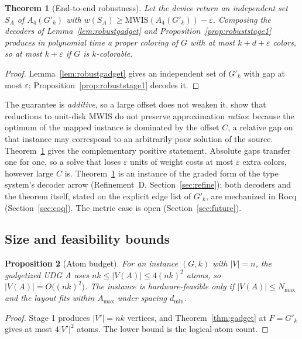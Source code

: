 \documentclass[a4paper,fleqn]{cas-sc}
\newtheorem{theorem}{Theorem}[section]
\newtheorem{proposition}[theorem]{Proposition}
\newcommand{\MWIS}{\mathrm{MWIS}}
\begin{document}
\begin{theorem}[End-to-end robustness]
\label{thm:robust}
Let the device return an independent set $S_A$ of $A_4(G'_k)$ with
$w(S_A)\ge\MWIS(A_4(G'_k))-\varepsilon$. Composing the decoders of
Lemma~\ref{lem:robustgadget} and Proposition~\ref{prop:robuststage1} produces in
polynomial time a proper coloring of $G$ with at most $k+d+\varepsilon$ colors,
so at most $k+\varepsilon$ if $G$ is $k$-colorable.
\end{theorem}

\begin{proof}
Lemma~\ref{lem:robustgadget} gives an independent set of $G'_k$ with gap at most
$\varepsilon$; Proposition~\ref{prop:robuststage1} decodes it.
\end{proof}

The guarantee is \emph{additive}, so a large offset does not weaken it.
\citet{Cazals2025} show that reductions to unit-disk MWIS do not preserve
approximation \emph{ratios}: because the optimum of the mapped instance is dominated
by the offset $C$, a relative gap on that instance may correspond to an arbitrarily
poor solution of the source. Theorem~\ref{thm:robust} gives the complementary
positive statement. Absolute gaps transfer one for one, so a solve that loses
$\varepsilon$ units of weight costs at most $\varepsilon$ extra colors, however large
$C$ is. Theorem~\ref{thm:robust} is an instance of the graded form of the type
system's decoder arrow (Refinement~D, Section~\ref{sec:refine}); both decoders and the
theorem itself, stated on the explicit edge list of $G'_k$, are mechanized in Rocq
(Section~\ref{sec:coq}). The metric case is open (Section~\ref{sec:future}).

\subsection{Size and feasibility bounds}
\label{sec:size}

\begin{proposition}[Atom budget]
\label{prop:atombudget}
For an instance $(G,k)$ with $|V|=n$, the gadgetized UDG $A$ uses
$nk\le|V(A)|\le4(nk)^2$ atoms, so $|V(A)|=O\bigl((nk)^2\bigr)$. The instance is
hardware-feasible only if $|V(A)|\le N_{\max}$ and the layout fits within $A_{\max}$
under spacing $d_{\min}$.
\end{proposition}

\begin{proof}
Stage 1 produces $|V'|=nk$ vertices, and Theorem~\ref{thm:gadget} at $F=G'_k$ gives at
most $4|V'|^2$ atoms. The lower bound is the logical-atom count.
\end{proof}
\end{document}
